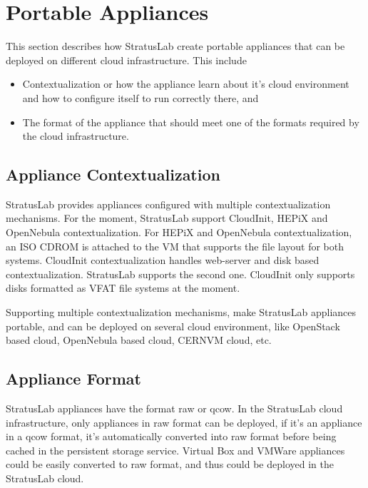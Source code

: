 \section{Portable Appliances}

This section describes how StratusLab create portable appliances that can be deployed on different cloud infrastructure. This include 
\begin{itemize}
\item Contextualization or how the appliance learn about it's cloud environment and how to configure itself to run correctly there, and 
\item  The format of the appliance that should meet one of the formats required by the cloud infrastructure.
\end{itemize}
\subsection{Appliance Contextualization}
StratusLab provides appliances configured with multiple contextualization mechanisms. For the moment, StratusLab support CloudInit, HEPiX and OpenNebula contextualization.
For HEPiX and OpenNebula contextualization, an ISO CDROM is attached to the VM that supports the file layout for both systems.
CloudInit contextualization handles web-server and disk based contextualization. StratusLab supports the second one. CloudInit only supports disks formatted as VFAT file systems at the moment.

Supporting multiple contextualization mechanisms, make StratusLab appliances portable, and can be deployed on several cloud environment, like OpenStack based cloud, OpenNebula based cloud, CERNVM cloud, etc.

\subsection{Appliance Format}
StratusLab appliances have the format raw or qcow. In the StratusLab cloud infrastructure, only appliances in raw format can be deployed, if it's an appliance in a qcow format, it's automatically converted into raw format before being cached in the persistent storage service. Virtual Box and VMWare appliances could be easily converted to raw format, and thus could be deployed in the StratusLab cloud.

